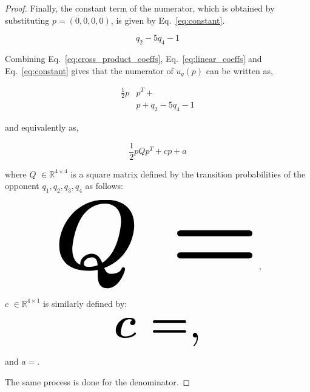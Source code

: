 \documentclass[10pt]{article}
\newcommand{\R}{\mathbb{R}}
\begin{document}
\begin{proof}
    Finally, the constant term of the numerator, which is obtained by substituting
    $p=(0, 0, 0, 0)$, is given by Eq.~\ref{eq:constant}.
    
    \begin{equation}\label{eq:constant}
    q_{2} - 5 q_{4} - 1
    \end{equation}
    
    Combining Eq.~\ref{eq:cross_product_coeffs}, Eq.~\ref{eq:linear_coeffs} and Eq.~\ref{eq:constant}
    gives that the numerator of \(u_q(p)\) can be written as,
    
    \begingroup
    \tiny\boldmath
    \begin{align*}
        \frac{1}{2}p &  p^T +  \\
        &  p + q_{2} - 5 q_{4} - 1
    \end{align*}
    \endgroup
    
    and equivalently as,
    
    \[\frac{1}{2}pQp^T + cp + a\]
    
    where \(Q\) \(\in \R^{4\times4}\) is a square matrix defined by the
    transition probabilities of the opponent \(q_1, q_2, q_3, q_4\) as follows:
    
    \begin{equation*}
        \resizebox{0.7\linewidth}{!}{\arraycolsep=2.5pt%
        \boldmath\(
        Q = \)},
    \end{equation*}
    
    \(c\) \(\in \R^{4 \times 1}\) is similarly defined by:
    
    \begin{equation*}
        \resizebox{0.3\linewidth}{!}{\arraycolsep=2.5pt%
        \boldmath\(c = \),}
    \end{equation*}
    
    and \(a = \).
    
    The same process is done for the denominator.
\end{proof}
\end{document}
